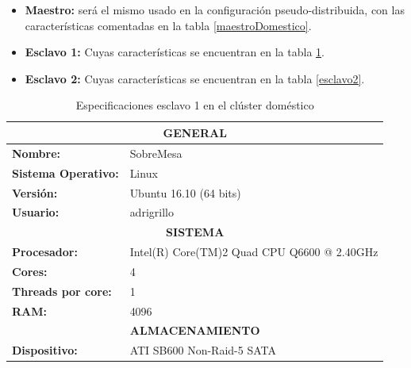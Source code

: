 \begin{itemize}
	\item \textbf{Maestro:} será el mismo usado en la configuración pseudo-distribuida, con las características comentadas en la tabla \ref{maestroDomestico}.
	
	\item \textbf{Esclavo 1:} Cuyas características se encuentran en la tabla \ref{esclavo1}.

	\item \textbf{Esclavo 2:} Cuyas características se encuentran en la tabla \ref{esclavo2}.
\end{itemize}
\begin{table}[htp!]
	\centering
	\caption{Especificaciones esclavo 1 en el clúster doméstico}
	\label{esclavo1}
	\begin{tabular}{|l|l|}
		\hline
		\multicolumn{2}{|c|}{\textbf{GENERAL}}                                                                \\ \hline
		\textbf{Nombre:}            & SobreMesa                                                               \\ \hline
		\textbf{Sistema Operativo:} & Linux                                                                   \\ \hline
		\textbf{Versión:}           & Ubuntu 16.10 (64 bits)                                                  \\ \hline
		\textbf{Usuario:}           & adrigrillo                                                              \\ \hline
		\multicolumn{2}{|c|}{\textbf{SISTEMA}}                                                                \\ \hline
		\textbf{Procesador:}        & Intel(R) Core(TM)2 Quad CPU    Q6600  @ 2.40GHz                         \\ \hline
		\textbf{Cores:}             & 4                                                                       \\ \hline
		\textbf{Threads por core:}  & 1                                                                       \\ \hline
		\textbf{RAM:}               & 4096                                                                    \\ \hline
		\multicolumn{2}{|c|}{\textbf{ALMACENAMIENTO}}                                                         \\ \hline
		\textbf{Dispositivo:}       & ATI SB600 Non-Raid-5 SATA                                               \\ \hline

\end{tabular}
\end{table}
